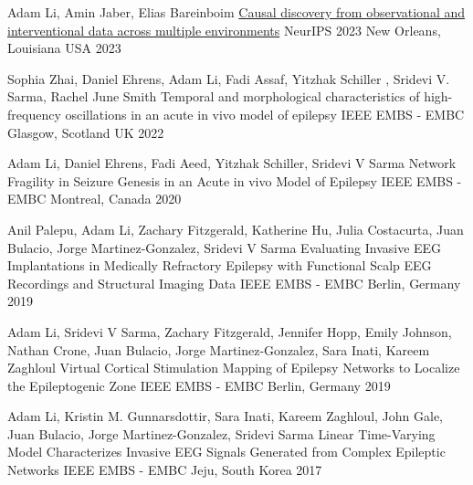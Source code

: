 \begin{cventries}
    \cvpresentation
    {Adam Li, Amin Jaber, Elias Bareinboim} %
    {\href{https://causalai.net/r98.pdf}{Causal discovery from observational and
interventional data across multiple environments}} %
    {NeurIPS 2023} %
    {New Orleans, Louisiana USA 2023} %
    {\empty}
    {\empty}
    \vspace{-0.9cm}
    

    \cvpresentation
    {Sophia Zhai, Daniel Ehrens, Adam Li, Fadi Assaf, Yitzhak Schiller , Sridevi V. Sarma, Rachel June Smith} %
    {Temporal and morphological characteristics of high-frequency oscillations in an acute in vivo model of epilepsy} %
    {IEEE EMBS - EMBC} %
    {Glasgow, Scotland UK 2022} %
    {\empty}
    {\empty}
    \vspace{-0.9cm}

    \cvpresentation
    {Adam Li, Daniel Ehrens, Fadi Aeed, Yitzhak Schiller, Sridevi V Sarma} %
    {Network Fragility in Seizure Genesis in an Acute in vivo Model of Epilepsy} %
    {IEEE EMBS - EMBC} %
    {Montreal, Canada 2020} %
    {\empty}
    {\empty}
    \vspace{-0.9cm}
    
    \cvpresentation
    {Anil Palepu, Adam Li, Zachary Fitzgerald, Katherine Hu, Julia Costacurta, Juan Bulacio, Jorge Martinez-Gonzalez, Sridevi V Sarma} %
    {Evaluating Invasive EEG Implantations in Medically Refractory Epilepsy with Functional Scalp EEG Recordings and Structural Imaging Data} %
    {IEEE EMBS - EMBC} %
    {Berlin, Germany 2019} %
    {\empty}
    {\empty}
    \vspace{-0.9cm}
    
    \cvpresentation
    {Adam Li, Sridevi V Sarma, Zachary Fitzgerald, Jennifer Hopp, Emily Johnson, Nathan Crone, Juan Bulacio, Jorge Martinez-Gonzalez, Sara Inati, Kareem Zaghloul} %
    {Virtual Cortical Stimulation Mapping of Epilepsy Networks to Localize the Epileptogenic Zone} %
    {IEEE EMBS - EMBC} %
    {Berlin, Germany 2019} %
    {\empty}
    {\empty}
    \vspace{-0.9cm}
    
    \cvpresentation
    {Adam Li, Kristin M. Gunnarsdottir, Sara Inati, Kareem Zaghloul, John Gale, Juan Bulacio, Jorge Martinez-Gonzalez, Sridevi Sarma} %
    {Linear Time-Varying Model Characterizes Invasive EEG Signals Generated from Complex Epileptic Networks} %
    {IEEE EMBS - EMBC} %
    {Jeju, South Korea 2017} %
    {\empty}
    {\empty}
    \vspace{-0.9cm}
    

\end{cventries}
